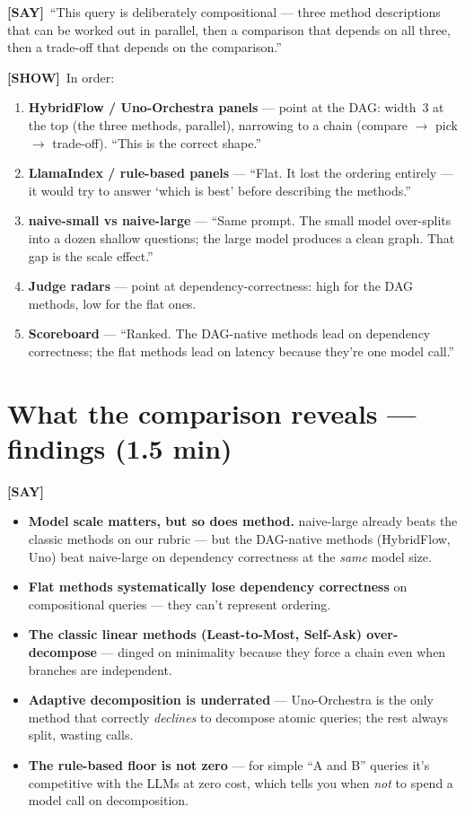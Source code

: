 \documentclass[11pt]{article}
\newcommand{\say}{\textcolor{sayc}{\textbf{[SAY]}}\ }
\newcommand{\showcue}{\textcolor{showc}{\textbf{[SHOW]}}\ }
\begin{document}
\say ``This query is deliberately compositional --- three method descriptions that
can be worked out in parallel, then a comparison that depends on all three, then a
trade-off that depends on the comparison.''

\showcue In order:
\begin{enumerate}[leftmargin=1.6em,itemsep=2pt]
  \item \textbf{HybridFlow / Uno-Orchestra panels} --- point at the DAG: width~3
  at the top (the three methods, parallel), narrowing to a chain (compare
  $\rightarrow$ pick $\rightarrow$ trade-off). ``This is the correct shape.''
  \item \textbf{LlamaIndex / rule-based panels} --- ``Flat. It lost the ordering
  entirely --- it would try to answer `which is best' before describing the
  methods.''
  \item \textbf{naive-small vs naive-large} --- ``Same prompt. The small model
  over-splits into a dozen shallow questions; the large model produces a clean
  graph. That gap is the scale effect.''
  \item \textbf{Judge radars} --- point at dependency-correctness: high for the
  DAG methods, low for the flat ones.
  \item \textbf{Scoreboard} --- ``Ranked. The DAG-native methods lead on
  dependency correctness; the flat methods lead on latency because they're one
  model call.''
\end{enumerate}

\section{What the comparison reveals --- findings (1.5 min)}

\say
\begin{itemize}
  \item \textbf{Model scale matters, but so does method.} naive-large already
  beats the classic methods on our rubric --- but the DAG-native methods
  (HybridFlow, Uno) beat naive-large on dependency correctness at the \emph{same}
  model size.
  \item \textbf{Flat methods systematically lose dependency correctness} on
  compositional queries --- they can't represent ordering.
  \item \textbf{The classic linear methods (Least-to-Most, Self-Ask)
  over-decompose} --- dinged on minimality because they force a chain even when
  branches are independent.
  \item \textbf{Adaptive decomposition is underrated} --- Uno-Orchestra is the
  only method that correctly \emph{declines} to decompose atomic queries; the
  rest always split, wasting calls.
  \item \textbf{The rule-based floor is not zero} --- for simple ``A and B''
  queries it's competitive with the LLMs at zero cost, which tells you when
  \emph{not} to spend a model call on decomposition.
\end{itemize}
\end{document}
